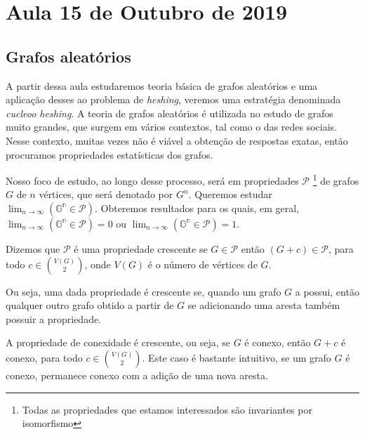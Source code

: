 \section{Aula 15 de Outubro de 2019}
\label{2019_10_15}

\subsection{Grafos aleatórios}

A partir dessa aula estudaremos teoria básica de grafos aleatórios e uma aplicação desses ao problema de \emph{heshing}, veremos uma estratégia denominada \emph{cucleoo heshing}. A teoria de grafos aleatórios é utilizada no estudo de grafos muito grandes, que surgem em vários contextos, tal como o das redes sociais. Nesse contexto, muitas vezes não é viável a obtenção de respostas exatas, então procuramos propriedades estatísticas dos grafos.

Nosso foco de estudo, ao longo desse processo, será em propriedades $\mathcal{P}$ \footnote{ Todas as propriedades que estamos interessados são invariantes por isomorfismo} de grafos $G$ de $n$ vértices, que será denotado por $G^n$. Queremos estudar $\lim_{n \rightarrow \infty}\mathbb{(G^n \in \mathcal{P})}$. Obteremos resultados para os quais, em geral, $\lim_{n \rightarrow \infty}\mathbb{(G^n \in \mathcal{P})} = 0$ ou $\lim_{n \rightarrow \infty}\mathbb{(G^n \in \mathcal{P})} = 1$.

\begin{definicao}
Dizemos que $\mathcal{P}$ é uma propriedade crescente se $G \in \mathcal{P}$ então $(G + c )\in \mathcal{P}$, para todo $c \in \binom{V(G)}{2}$, onde $V(G)$ é o número de vértices de $G$.
\end{definicao}{}

Ou seja, uma dada propriedade é crescente se, quando um grafo $G$ a possui, então qualquer outro grafo obtido a partir de $G$ se adicionando uma aresta também possuir a propriedade.

\begin{exemplo}
A propriedade de conexidade é crescente, ou seja, se $G$ é conexo, então $G + c$ é conexo, para todo $c \in \binom{V(G)}{2}$. Este caso é bastante intuitivo, se um grafo $G$ é conexo, permanece conexo com a adição de uma nova aresta.
\end{exemplo}{}

